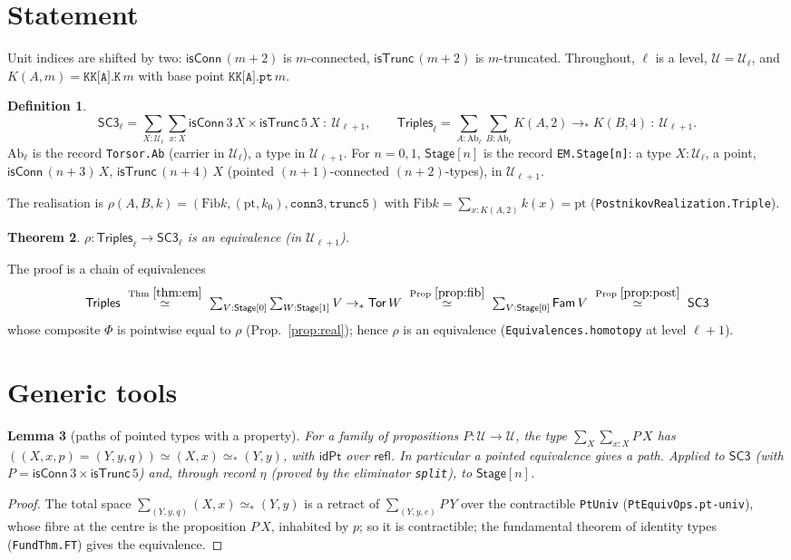 \documentclass[11pt]{amsart}
\newtheorem{theorem}{Theorem}
\newtheorem{lemma}[theorem]{Lemma}
\theoremstyle{definition}
\newtheorem{definition}[theorem]{Definition}
\theoremstyle{remark}
\newcommand{\code}[1]{\texttt{#1}}
\newcommand{\cT}{\mathsf{isTrunc}}
\newcommand{\cC}{\mathsf{isConn}}
\newcommand{\refl}{\mathsf{refl}}
\newcommand{\Fib}{\mathrm{Fib}}
\newcommand{\Ab}{\mathrm{Ab}}
\newcommand{\St}{\mathsf{Stage}}
\newcommand{\Tor}{\mathsf{Tor}}
\newcommand{\SC}{\mathsf{SC3}}
\newcommand{\Tri}{\mathsf{Triples}}
\newcommand{\Fam}{\mathsf{Fam}}
\newcommand{\pteq}{\simeq_*}
\newcommand{\U}{\mathcal{U}}
\begin{document}
\section{Statement}

Unit indices are shifted by two: $\cC\,(m{+}2)$ is $m$-connected, $\cT\,(m{+}2)$ is
$m$-truncated. Throughout, $\ell$ is a level, $\U=\U_\ell$, and
$K(A,m)=\code{KK[A].K}\,m$ with base point $\code{KK[A].pt}\,m$.

\begin{definition}\label{def:types}
\[\SC_\ell = \textstyle\sum_{X:\U_\ell}\sum_{x:X}\cC\,3\,X\times\cT\,5\,X\ :\ \U_{\ell+1},\qquad
\Tri_\ell=\sum_{A:\Ab_\ell}\sum_{B:\Ab_\ell} K(A,2)\to_*K(B,4)\ :\ \U_{\ell+1}.\]
$\Ab_\ell$ is the record \code{Torsor.Ab} (carrier in $\U_\ell$), a type in $\U_{\ell+1}$.
For $n=0,1$, $\St[n]$ is the record \code{EM.Stage[n]}: a type $X:\U_\ell$, a point,
$\cC\,(n{+}3)\,X$, $\cT\,(n{+}4)\,X$ (pointed $(n{+}1)$-connected $(n{+}2)$-types), in $\U_{\ell+1}$.
\end{definition}

The realisation is $\rho(A,B,k)=(\Fib k,(\mathrm{pt},k_0),\code{conn3},\code{trunc5})$ with
$\Fib k=\sum_{x:K(A,2)}k(x)=\mathrm{pt}$ (\code{PostnikovRealization.Triple}).

\begin{theorem}\label{thm:main}
$\rho:\Tri_\ell\to\SC_\ell$ is an equivalence (in $\U_{\ell+1}$).
\end{theorem}

The proof is a chain of equivalences
\[\Tri\ \overset{\text{Thm }\ref{thm:em}}{\simeq}\ \textstyle\sum_{V:\St[0]}\sum_{W:\St[1]}V\to_*\Tor\,W
\ \overset{\text{Prop }\ref{prop:fib}}{\simeq}\ \sum_{V:\St[0]}\Fam\,V
\ \overset{\text{Prop }\ref{prop:post}}{\simeq}\ \SC\]
whose composite $\Phi$ is pointwise equal to $\rho$ (Prop.~\ref{prop:real}); hence $\rho$ is
an equivalence (\code{Equivalences.homotopy} at level $\ell{+}1$).

\section{Generic tools}

\begin{lemma}[paths of pointed types with a property]\label{lem:ptprop}
For a family of propositions $P:\U\to\U$, the type $\sum_{X}\sum_{x:X}P\,X$ has
$((X,x,p)=(Y,y,q))\simeq (X,x)\pteq(Y,y)$, with $\mathsf{idPt}$ over $\refl$. In particular
a pointed equivalence gives a path. Applied to $\SC$ (with $P=\cC\,3\times\cT\,5$) and,
through record $\eta$ (proved by the eliminator \code{split}), to $\St[n]$.
\end{lemma}
\begin{proof} The total space $\sum_{(Y,y,q)}(X,x)\pteq(Y,y)$ is a retract of
$\sum_{(Y,y,e)}P\,Y$ over the contractible \code{PtUniv} (\code{PtEquivOps.pt-univ}), whose fibre
at the centre is the proposition $P\,X$, inhabited by $p$; so it is contractible; the fundamental
theorem of identity types (\code{FundThm.FT}) gives the equivalence. \end{proof}
\end{document}
